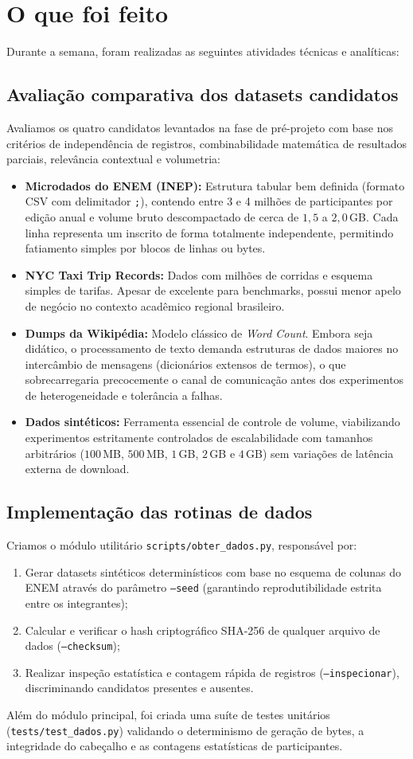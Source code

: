 \section{O que foi feito}

Durante a semana, foram realizadas as seguintes atividades técnicas e analíticas:

\subsection{Avaliação comparativa dos datasets candidatos}
Avaliamos os quatro candidatos levantados na fase de pré-projeto com base nos
critérios de independência de registros, combinabilidade matemática de
resultados parciais, relevância contextual e volumetria:
\begin{itemize}
  \item \textbf{Microdados do ENEM (INEP):} Estrutura tabular bem definida
    (formato CSV com delimitador \texttt{;}), contendo entre 3 e 4 milhões de
    participantes por edição anual e volume bruto descompactado de cerca de
    $1{,}5$ a $2{,}0$\,GB. Cada linha representa um inscrito de forma
    totalmente independente, permitindo fatiamento simples por blocos de linhas
    ou bytes.
  \item \textbf{NYC Taxi Trip Records:} Dados com milhões de corridas e
    esquema simples de tarifas. Apesar de excelente para benchmarks, possui
    menor apelo de negócio no contexto acadêmico regional brasileiro.
  \item \textbf{Dumps da Wikipédia:} Modelo clássico de \emph{Word Count}.
    Embora seja didático, o processamento de texto demanda estruturas de dados
    maiores no intercâmbio de mensagens (dicionários extensos de termos), o
    que sobrecarregaria precocemente o canal de comunicação antes dos
    experimentos de heterogeneidade e tolerância a falhas.
  \item \textbf{Dados sintéticos:} Ferramenta essencial de controle de
    volume, viabilizando experimentos estritamente controlados de escalabilidade
    com tamanhos arbitrários ($100$\,MB, $500$\,MB, $1$\,GB, $2$\,GB e
    $4$\,GB) sem variações de latência externa de download.
\end{itemize}

\subsection{Implementação das rotinas de dados}
Criamos o módulo utilitário \texttt{scripts/obter\_dados.py}, responsável por:
\begin{enumerate}
  \item Gerar datasets sintéticos determinísticos com base no esquema de
    colunas do ENEM através do parâmetro \texttt{--seed} (garantindo
    reprodutibilidade estrita entre os integrantes);
  \item Calcular e verificar o hash criptográfico SHA-256 de qualquer arquivo
    de dados (\texttt{--checksum});
  \item Realizar inspeção estatística e contagem rápida de registros
    (\texttt{--inspecionar}), discriminando candidatos presentes e ausentes.
\end{enumerate}

Além do módulo principal, foi criada uma suíte de testes unitários
(\texttt{tests/test\_dados.py}) validando o determinismo de geração de bytes,
a integridade do cabeçalho e as contagens estatísticas de participantes.
